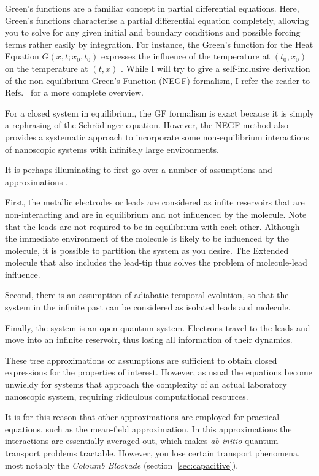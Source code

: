 Green's functions are a familiar concept in partial differential equations. Here, Green's functions characterise a partial differential equation completely, allowing you to solve for any given initial and boundary conditions and possible forcing terms rather easily by integration. For instance, the Green's function for the Heat Equation $G(x,t; x_0, t_0)$ expresses the influence of the temperature at $(t_0, x_0)$ on the temperature at $(t,x)$ \cite{haberman}. 
While I will try to give a self-inclusive derivation of the non-equilibrium Green's Function (NEGF) formalism, I refer the reader to Refs.~\cite{mattuck,diventra,haugjauho} for a more complete overview.

For a closed system in equilibrium, the GF formalism is exact because it is simply a rephrasing of the Schr\"odinger equation. However, the NEGF method also provides a systematic approach to incorporate some non-equilibrium interactions of nanoscopic systems with infinitely large environments.

It is perhaps illuminating to first go over a number of assumptions and approximations \cite{seldenthuis}. 

First, the metallic electrodes or leads are considered as infite reservoirs that are non-interacting and are in equilibrium and not influenced by the molecule. Note that the leads are not required to be in equilibrium with each other. Although the immediate environment of the molecule is likely to be influenced by the molecule, it is possible to partition the system as you desire. The Extended molecule that also includes the lead-tip thus solves the problem of molecule-lead influence.

Second, there is an assumption of adiabatic temporal evolution, so that the system in the infinite past can be considered as isolated leads and molecule.  

Finally, the system is an open quantum system. Electrons travel to the leads and move into an infinite reservoir, thus losing all information of their dynamics. 

These tree approximations or assumptions are sufficient to obtain closed expressions for the properties of interest. However, as usual the equations become unwieldy for systems that approach the complexity of an actual laboratory nanoscopic system, requiring ridiculous computational resources.

It is for this reason that other approximations are employed for practical equations, such as the mean-field approximation. In this approximations the interactions are essentially averaged out, which makes \emph{ab initio} quantum transport problems tractable. However, you lose certain transport phenomena, most notably the \emph{Coloumb Blockade} (section~\ref{sec:capacitive}).

